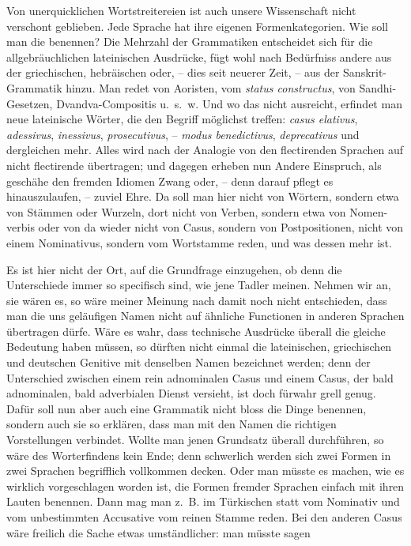 Von unerquicklichen Wortstreitereien ist auch unsere Wissenschaft nicht verschont geblieben. Jede Sprache hat ihre eigenen Formenkategorien. Wie soll man die benennen? Die Mehrzahl der Grammatiken entscheidet sich für die allgebräuchlichen lateinischen Ausdrücke, fügt wohl nach Bedürfniss andere aus der griechischen, hebräischen oder, – dies seit neuerer Zeit, – aus der Sanskrit-Gram\-matik hinzu. Man redet von Aoristen, vom \textit{status constructus}, von Sandhi-Gesetzen, Dvandva-Compositis u.~s.~w. Und wo das nicht ausreicht, erfindet man neue lateinische Wörter, die den Begriff möglichst treffen: \textit{casus elativus},  \textit{adessivus}, \textit{inessivus}, \textit{prosecutivus}, – \textit{modus benedictivus}, \textit{deprecativus} und dergleichen mehr. Alles wird nach der Analogie von den flectirenden Sprachen auf nicht flectirende übertragen; und dagegen erheben nun Andere Einspruch, als geschähe den fremden Idiomen Zwang oder, – denn darauf pflegt es hinauszulaufen, – zuviel Ehre. Da soll man hier nicht von Wörtern, sondern etwa von Stämmen oder Wurzeln, dort nicht von Verben, sondern etwa von \label{sp.115} Nomen-verbis oder von  da wieder nicht von Casus, sondern von Postpositionen, nicht von einem Nominativus, sondern vom Wortstamme reden, und was dessen mehr ist.

\label{fp.121}

Es ist hier nicht der Ort, auf die Grundfrage einzugehen, ob denn die Unterschiede immer so specifisch sind, wie jene Tadler meinen. Nehmen wir an, sie wären es, so wäre meiner Meinung nach damit noch nicht entschieden, dass man die uns geläufigen Namen nicht auf ähnliche Functionen in anderen Sprachen übertragen dürfe. Wäre es wahr, dass technische Ausdrücke überall die gleiche Bedeutung haben müssen, so dürften nicht einmal die lateinischen, griechischen und deutschen Genitive mit denselben Namen bezeichnet werden; denn der Unterschied zwischen einem rein adnominalen Casus und einem Casus, der bald adnominalen, bald adverbialen Dienst versieht, ist doch fürwahr grell genug. Dafür soll nun aber auch eine Grammatik nicht bloss die Dinge benennen, sondern auch sie so erklären, dass man mit den Namen die richtigen Vorstellungen verbindet. Wollte man jenen Grundsatz überall durchführen, so wäre des Worterfindens kein Ende; denn schwerlich werden sich zwei Formen in zwei Sprachen begrifflich vollkommen decken. Oder man müsste es machen, wie es wirklich vorgeschlagen worden ist, die Formen fremder Sprachen einfach mit ihren Lauten benennen. Dann mag man z.~B. im Türkischen statt vom Nominativ und vom unbestimmten Accusative vom reinen Stamme reden. Bei den anderen Casus wäre freilich die Sache etwas umständlicher: man müsste sagen

